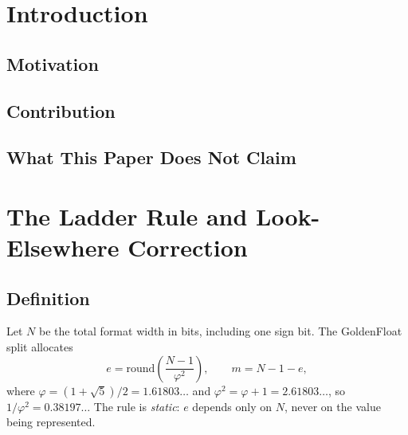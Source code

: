\documentclass[conference]{IEEEtran}
\begin{document}
\section{Introduction}
\label{sec:intro}


\subsection{Motivation}

\subsection{Contribution}

\subsection{What This Paper Does Not Claim}

\section{The Ladder Rule and Look-Elsewhere Correction}
\label{sec:ladder}


\subsection{Definition}
Let $N$ be the total format width in bits, including one sign bit. The
GoldenFloat split allocates
\begin{equation}
\label{eq:rule}
e = \mathrm{round}\!\left(\frac{N-1}{\varphi^2}\right), \qquad m = N - 1 - e,
\end{equation}
where $\varphi = (1+\sqrt{5})/2 = 1.61803\ldots$ and $\varphi^2 =
\varphi + 1 = 2.61803\ldots$, so $1/\varphi^2 = 0.38197\ldots$ The rule
is \emph{static}: $e$ depends only on $N$, never on the value being
represented.
\end{document}
